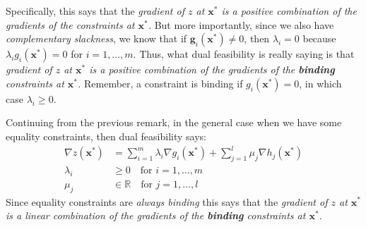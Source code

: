 Specifically, this says that the \textit{gradient of $z$ at $\mathbf{x}^*$ is a positive combination of the gradients of the constraints at $\mathbf{x}^*$.} But more importantly, since we also have \textit{complementary slackness}, we know that if $\mathbf{g}_i(\mathbf{x}^*) \neq 0$, then $\lambda_i = 0$ because $\lambda_i g_i(\mathbf{x}^*) = 0$ for $i = 1,\dots,m$. Thus, what dual feasibility is really saying is that \textit{gradient of $z$ at $\mathbf{x}^*$ is a positive combination of the  gradients of the \textbf{binding} constraints at $\mathbf{x}^*$.} Remember, a constraint is binding if $g_i(\mathbf{x}^*) = 0$, in which case $\lambda_i \geq 0$.


\begin{remark} Continuing from the previous remark, in the general case when we have some equality constraints, then dual feasibility says:
\begin{displaymath}
\begin{aligned}
\nabla z(\mathbf{x}^*) &= \sum_{i = 1}^m\lambda_i \nabla g_i(\mathbf{x}^*) + \sum_{j = 1}^{l}\mu_j \nabla h_j(\mathbf{x}^*)\\
\lambda_i &\geq 0 \quad \text{for $i=1,\dots,m$}\\
\mu_j &\in \mathbb{R}\quad \text{for $j=1,\dots,l$}
\end{aligned}
\end{displaymath}
Since equality constraints are \textit{always binding} this says that the \textit{gradient of $z$ at $\mathbf{x}^*$ is a linear combination of the  gradients of the \textbf{binding} constraints at $\mathbf{x}^*$.} 
\end{remark}

